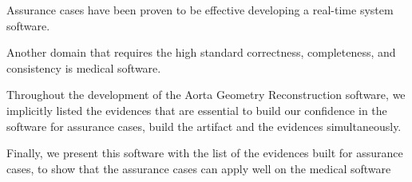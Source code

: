 
Assurance cases have been proven to be effective developing a real-time system software.

Another domain that requires the high standard correctness, completeness, and consistency is medical software.

Throughout the development of the Aorta Geometry Reconstruction software, we implicitly listed the evidences that are essential to build our confidence in the software for assurance cases, build the artifact and the evidences simultaneously. 

Finally, we present this software with the list of the evidences built for assurance cases, to show that the assurance cases can apply well on the medical software